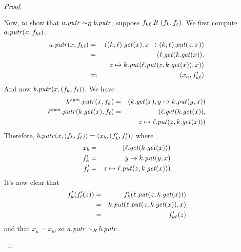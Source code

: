 \begin{defn}[$R$-similarity]
\begin{theorem}
\begin{lemma}
\begin{theorem}[No products]
\begin{lemma}
\begin{defn}
\begin{theorem}
\begin{theorem}
\begin{corollary}[Hylomorphism]
\begin{defn}
\begin{defn}
\begin{defn}[Symmetrization]
\begin{proof}
\begin{longenum}
Now, to show that $a.\mathit{putr} \sim_R b.\mathit{putr}$, suppose
$f_{k\ell}\mathrel{R_{}}(f_k,f_\ell)$. We first compute $a.\mathit{putr}(x,f_{k\ell})$.
\begin{eqnarray*}
    a.\mathit{putr}(x,f_{k\ell}) &=& ((k;\ell).\mathit{get}(x),z \mapsto (k;\ell).\mathit{put}(z,x)) \\
    &=& (\ell.\mathit{get}(k.\mathit{get}(x)), \\
    & & z \mapsto k.\mathit{put}(\ell.\mathit{put}(z,k.\mathit{get}(x)),x)) \\
    &=:& (x_a,f_{k\ell}')
\end{eqnarray*}
And now $b.\mathit{putr}(x,(f_k,f_\ell))$. We have
\begin{eqnarray*}
    k^\mathit{sym}.\mathit{putr}(x,f_k) &=& (k.\mathit{get}(x),y \mapsto k.\mathit{put}(y,x)) \\
    \ell^\mathit{sym}.\mathit{putr}(k.\mathit{get}(x),f_\ell) &=& (\ell.\mathit{get}(k.\mathit{get}(x)), \\
    & & z \mapsto \ell.\mathit{put}(z,k.\mathit{get}(x))) 
\end{eqnarray*}
Therefore, $b.\mathit{putr}(x,(f_k,f_\ell)) = (x_b,(f_k',f_\ell'))$ where
\begin{eqnarray*}
x_b &=& (\ell.\mathit{get}(k.\mathit{get}(x)))\\
f_k' &=& y \mapsto k.\mathit{put}(y,x)\\
f_\ell' &=& z \mapsto \ell.\mathit{put}(z,k.\mathit{get}(x))) 
\end{eqnarray*}
It's now clear that
\begin{eqnarray*}
    f_k'(f_\ell'(z)) &=& f_k'(\ell.\mathit{put}(z,k.\mathit{get}(x))) \\
    &=& k.\mathit{put}(\ell.\mathit{put}(z,k.\mathit{get}(x)),x) \\
    &=& f_{k\ell}'(z)
\end{eqnarray*}
and that $x_a=x_b$, so $a.\mathit{putr} \sim_R b.\mathit{putr}$.


\end{longenum}
\end{proof}
\end{defn}
\end{defn}
\end{defn}
\end{corollary}
\end{theorem}
\end{theorem}
\end{defn}
\end{lemma}
\end{theorem}
\end{lemma}
\end{theorem}
\end{defn}
